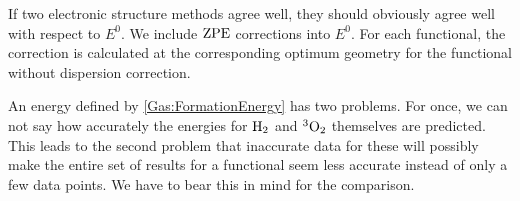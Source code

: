 If two electronic
structure methods agree well, they should obviously agree well with respect to
$E^0$.
We include $\text{ZPE}$ corrections into $E^0$. For each functional, 
the correction is calculated at the corresponding optimum geometry
for the functional without dispersion correction. 

An energy defined by \eqref{Gas:FormationEnergy} has two problems. For
once, we can not say how accurately the energies for $\text H_2$ and ${^3\text O_2}$
themselves are predicted. This leads to the second problem that inaccurate
data for these will possibly make the entire set of results for a functional
seem less accurate instead of only a few data points. We have to bear this in
mind for the comparison. 


